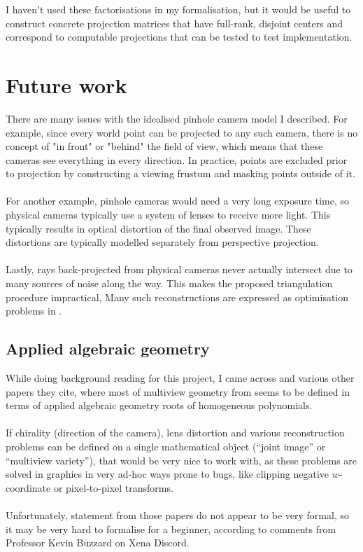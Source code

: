 \documentclass[a4paper, 12pt]{article}
\begin{document}
I haven't used these factorisations in my formalisation,
but it would be useful to construct concrete projection matrices
that have full-rank, disjoint centers and correspond to computable projections
that can be tested to test implementation.

\section*{Future work}

There are many issues with the idealised pinhole camera model I described.
For example, since every world point can be projected to any such camera,
there is no concept of "in front" or "behind" the field of view,
which means that these cameras see everything in every direction.
In practice, points are excluded prior to projection
by constructing a viewing frustum and masking points outside of it.
\\ \\
For another example, pinhole cameras would need a very long exposure time,
so physical cameras typically use a system of lenses to receive more light.
This typically results in optical distortion of the final observed image.
These distortions are typically modelled separately from perspective projection.
\\ \\
Lastly, rays back-projected from physical cameras
never actually intersect due to many sources of noise along the way.
This makes the proposed triangulation procedure impractical,
Many such reconstructions are expressed as optimisation problems in \cite{hartley_multiple_2004}.

\subsection*{Applied algebraic geometry}

While doing background reading for this project,
I came across \cite{kileel_snapshot_2023,agarwal_atlas_2024,ponce_congruences_2017}
and various other papers they cite,
where most of multiview geometry from \cite{hartley_multiple_2004}
seems to be defined in terms of
applied algebraic geometry roots of homogeneous polynomials.
\\ \\
If chirality (direction of the camera),
lens distortion and various reconstruction problems
can be defined on a single mathematical object
(``joint image'' or ``multiview variety''),
that would be very nice to work with,
as these problems are solved in graphics in very ad-hoc ways prone to bugs,
like clipping negative $w$-coordinate or pixel-to-pixel transforms.
\\ \\
Unfortunately, statement from those papers do not appear to be very formal,
so it may be very hard to formalise for a beginner,
according to comments from Professor Kevin Buzzard on Xena Discord.
\end{document}
